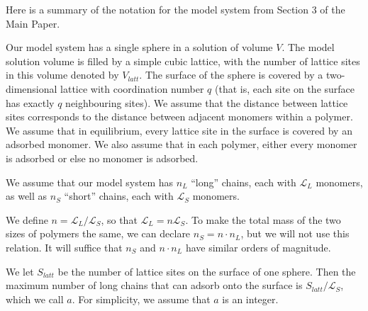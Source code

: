 \documentclass[journal=mamobx,manuscript=article]{achemso}
\newcommand{\leng}{\mathcal{L}}
\begin{document}
Here is a summary of the notation for the model system 
from Section 3 of the Main Paper.

Our model system has a single sphere in a solution of
volume $V$.  The model solution volume is filled by a 
simple cubic lattice, with the number of lattice sites in this volume denoted by $V_{latt}$.
The surface of the sphere is covered by a  two-dimensional lattice with coordination number $q$ 
(that is, each site on the surface has exactly $q$ neighbouring sites).  We assume that 
the distance between lattice sites corresponds to the distance between adjacent monomers within a 
polymer.  We assume that in equilibrium, every lattice site in the surface is covered by an adsorbed 
monomer.  We also assume that in each polymer, either every 
monomer is adsorbed or else no monomer is adsorbed.
 



We assume that our model system has $n_L$ ``long'' chains, each
with $\leng_L$ monomers, as well as $n_S$ ``short''
chains, each with $\leng_S$ monomers.

We define $n=\leng_L/\leng_S$, so that $\leng_L=n\leng_S$.   To make the total mass
of the two sizes of polymers the same, we can
declare $n_S=n \cdot n_L$, but we will not use
this relation.  It will suffice that $n_S$ and 
$n\cdot n_L$ have similar orders of magnitude.

We let $S_{latt}$ be the number of lattice sites on 
the surface of one sphere.  Then the maximum number of 
long chains that can adsorb onto the surface is 
$S_{latt}/\leng_S$, which we call $a$. For 
simplicity, we assume that $a$ is an integer.


\end{document}
